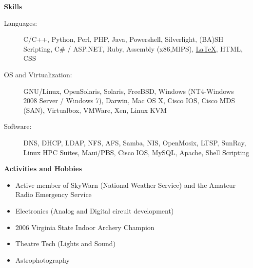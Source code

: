 \documentclass[letterpaper,11pt]{article}
\newcommand{\resheading}[1]{{\large \colorbox{mygrey}{\begin{minipage}{\textwidth}{\textbf{#1 \vphantom{p\^{E}}}}\end{minipage}}}}
\begin{document}
\begin{itemize}
	\end{itemize}  %


\resheading{Skills}
	\begin{description}
		\item[Languages:] { \footnotesize C/C++, Python, Perl, PHP, Java, Powershell, Silverlight, (BA)SH Scripting, C\# / ASP.NET, Ruby, Assembly (x86,MIPS), \href{http://www.latex-project.org/}{\LaTeX}}, \footnotesize HTML, CSS
		\item[OS and Virtualization:] { \footnotesize GNU/Linux, OpenSolaris, Solaris, FreeBSD, Windows (NT4-Windows 2008 Server / Windows 7), Darwin, Mac OS X, Cisco IOS, Cisco MDS (SAN), Virtualbox, VMWare, Xen, Linux KVM}
		\item[Software:] {\footnotesize DNS, DHCP, LDAP, NFS, AFS, Samba, NIS, OpenMosix, LTSP, SunRay, Linux HPC Suites, Maui/PBS, Cisco IOS, MySQL, Apache, Shell Scripting}
	\end{description} %

\resheading{Activities and Hobbies}
	\begin{itemize}
		\setlength{\itemsep}{1pt}
		\setlength{\parskip}{0pt}
		\setlength{\parsep}{0pt}
		\item {\footnotesize Active member of SkyWarn (National Weather Service) and the Amateur Radio Emergency Service}
		\item {\footnotesize Electronics (Analog and Digital circuit development)}
		\item {\footnotesize 2006 Virginia State Indoor Archery Champion}
		\item {\footnotesize Theatre Tech (Lights and Sound)}
		\item {\footnotesize Astrophotography}
	\end{itemize} 
\end{document}
